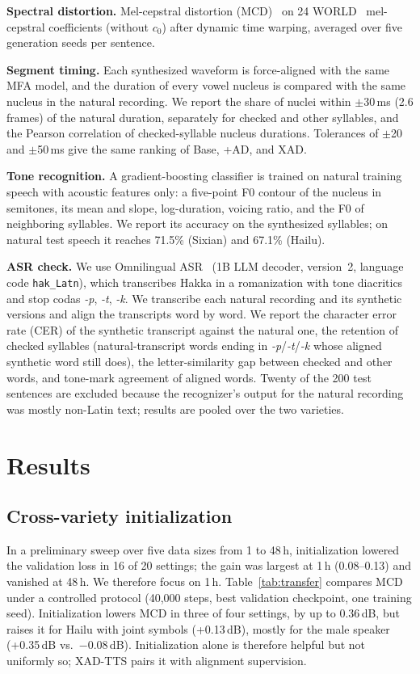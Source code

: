 \documentclass[conference,a4paper]{IEEEtran}
\begin{document}
\textbf{Spectral distortion.} Mel-cepstral distortion (MCD)~\cite{kubichek1993mcd} on 24 WORLD~\cite{morise2016world} mel-cepstral coefficients (without $c_0$) after dynamic time warping, averaged over five generation seeds per sentence.

\textbf{Segment timing.} Each synthesized waveform is force-aligned with the same MFA model, and the duration of every vowel nucleus is compared with the same nucleus in the natural recording. We report the share of nuclei within $\pm$30\,ms (2.6 frames) of the natural duration, separately for checked and other syllables, and the Pearson correlation of checked-syllable nucleus durations. Tolerances of $\pm$20 and $\pm$50\,ms give the same ranking of Base, +AD, and XAD.

\textbf{Tone recognition.} A gradient-boosting classifier is trained on natural training speech with acoustic features only: a five-point F0 contour of the nucleus in semitones, its mean and slope, log-duration, voicing ratio, and the F0 of neighboring syllables. We report its accuracy on the synthesized syllables; on natural test speech it reaches 71.5\% (Sixian) and 67.1\% (Hailu).

\textbf{ASR check.} We use Omnilingual ASR~\cite{omnilingual2025} (1B LLM decoder, version~2, language code \texttt{hak\_Latn}), which transcribes Hakka in a romanization with tone diacritics and stop codas \textit{-p}, \textit{-t}, \textit{-k}. We transcribe each natural recording and its synthetic versions and align the transcripts word by word. We report the character error rate (CER) of the synthetic transcript against the natural one, the retention of checked syllables (natural-transcript words ending in \textit{-p}/\textit{-t}/\textit{-k} whose aligned synthetic word still does), the letter-similarity gap between checked and other words, and tone-mark agreement of aligned words. Twenty of the 200 test sentences are excluded because the recognizer's output for the natural recording was mostly non-Latin text; results are pooled over the two varieties.

\section{Results}

\subsection{Cross-variety initialization}
In a preliminary sweep over five data sizes from 1 to 48\,h, initialization lowered the validation loss in 16 of 20 settings; the gain was largest at 1\,h (0.08--0.13) and vanished at 48\,h. We therefore focus on 1\,h. Table~\ref{tab:transfer} compares MCD under a controlled protocol (40{,}000 steps, best validation checkpoint, one training seed). Initialization lowers MCD in three of four settings, by up to 0.36\,dB, but raises it for Hailu with joint symbols (+0.13\,dB), mostly for the male speaker (+0.35\,dB vs.\ $-$0.08\,dB). Initialization alone is therefore helpful but not uniformly so; XAD-TTS pairs it with alignment supervision.
\end{document}
